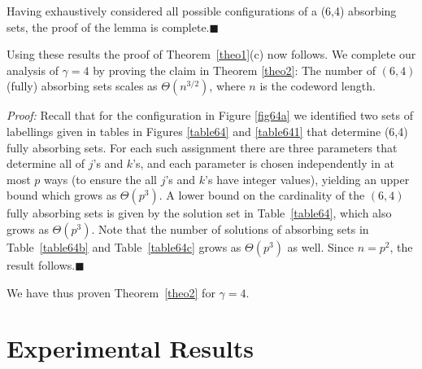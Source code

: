 
Having exhaustively considered  all possible configurations of a
(6,4) absorbing sets, the proof of the lemma is
complete.\hfill$\blacksquare$




Using these results the proof of Theorem~\ref{theo1}(c) now
follows.  We complete our analysis of
$\gamma=4$  by proving the claim in Theorem \ref{theo2}: The
number of $(6,4)$ (fully) absorbing sets scales as
$\Theta(n^{3/2})$, where $n$ is the
codeword length.%

\noindent \textit{Proof:} Recall that for the configuration in
Figure \ref{fig64a} we identified two sets of labellings given in
tables in Figures \ref{table64} and \ref{table641} that determine
(6,4) fully absorbing sets. For each such assignment there are
three parameters that determine all of $j$'s and $k$'s, and each
parameter is chosen independently in at most $p$ ways (to ensure
the all $j$'s and $k$'s have integer values), yielding an upper
bound which grows as $\Theta(p^3)$. A lower bound on the
cardinality of the $(6,4)$ fully absorbing sets is given by the
solution set in Table~\ref{table64}, which also grows as
$\Theta(p^3)$. Note that the number of solutions of absorbing sets
in Table~\ref{table64b} and Table~\ref{table64c} grows as
$\Theta(p^3)$ as well. Since $n=p^2$, the result
follows.\hfill$\blacksquare$

We have thus proven Theorem~\ref{theo2} for $\gamma=4$.

\section{Experimental Results}\label{expi}


